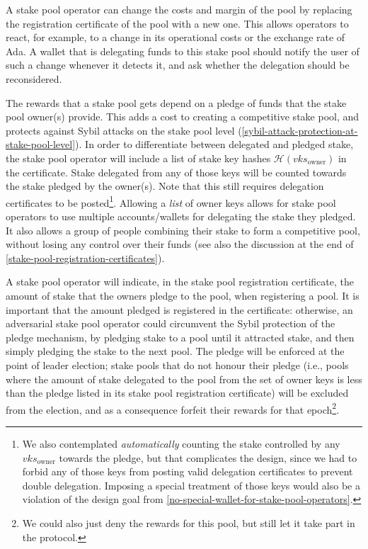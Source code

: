 \documentclass[11pt,a4paper]{article}
\begin{document}
A stake pool operator can change the costs and margin of the pool by
replacing the registration certificate of the pool with a new
one. This allows operators to react, for example, to a change in its
operational costs or the exchange rate of Ada. A wallet that is
delegating funds to this stake pool should notify the user of such a
change whenever it detects it, and ask whether the delegation should
be reconsidered.

The rewards that a stake pool gets depend on a pledge of funds that
the stake pool owner(s) provide. This adds a cost to creating a
competitive stake pool, and protects against Sybil attacks on the
stake pool level
(\cref{sybil-attack-protection-at-stake-pool-level}). In order to
differentiate between delegated and pledged stake, the stake pool
operator will include a list of stake key hashes
\(\mathcal{H}(vks_\text{owner})\)
in the certificate. Stake delegated from any of those keys will be
counted towards the stake pledged by the owner(s). Note that this
still requires delegation certificates to be posted\footnote{We also
  contemplated \emph{automatically} counting the stake controlled by
  any \(vks_\text{owner}\)
  towards the pledge, but that complicates the design, since we had
  to forbid any of those keys from posting valid delegation
  certificates to prevent double delegation. Imposing a special
  treatment of those keys would also be a violation of the design goal
  from \cref{no-special-wallet-for-stake-pool-operators}.}.
Allowing a \emph{list} of owner keys allows for stake pool operators
to use multiple accounts/wallets for delegating the stake they
pledged. It also allows a group of people combining their stake to
form a competitive pool, without losing any control over their funds
(see also the discussion at the end of
\cref{stake-pool-registration-certificates}).



A stake pool operator will indicate, in the stake pool registration
certificate,  the amount of stake that the owners pledge to
the pool, when registering a pool. It is important that the amount
pledged is registered in the certificate: otherwise,
an adversarial stake pool operator could circumvent the Sybil protection
of the pledge mechanism, by pledging stake to a pool until it attracted stake,
and then simply pledging the stake to the next pool. The pledge will be
enforced at the point of leader election; stake pools that do not
honour their pledge (i.e., pools where the amount of stake delegated
to the pool from the set of owner keys is less than the pledge listed
in its stake pool registration certificate) will be excluded from the election,
and as a consequence forfeit their rewards for that epoch\footnote{We
  could also just deny the rewards for this pool, but still let it take
  part in the protocol.}.
\end{document}
